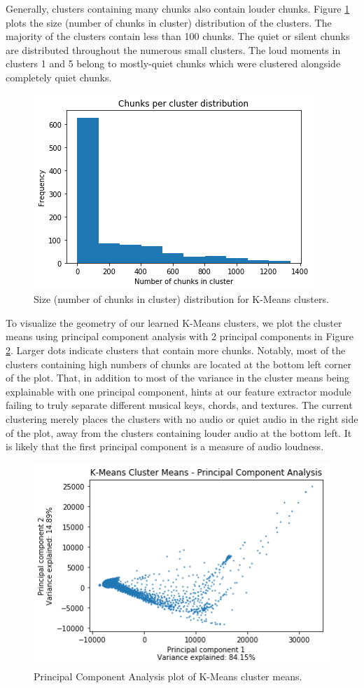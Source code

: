 \documentclass{article}
\begin{document}
Generally, clusters containing many chunks also contain louder chunks. Figure \ref{fig:chunks_per_cluster_distribution} plots the size (number of chunks in cluster) distribution of the clusters. The majority of the clusters contain less than 100 chunks. The quiet or silent chunks are distributed throughout the numerous small clusters. The loud moments in clusters 1 and 5 belong to mostly-quiet chunks which were clustered alongside completely quiet chunks.

\begin{figure}
    \centering
    \includegraphics[width=0.67 \linewidth]{chunks_per_cluster_distribution.png}
    \caption{Size (number of chunks in cluster) distribution for K-Means clusters.}
    \label{fig:chunks_per_cluster_distribution}
\end{figure}

To visualize the geometry of our learned K-Means clusters, we plot the cluster means using principal component analysis with 2 principal components in Figure \ref{fig:kmeans_pca}. Larger dots indicate clusters that contain more chunks. Notably, most of the clusters containing high numbers of chunks are located at the bottom left corner of the plot. That, in addition to most of the variance in the cluster means being explainable with one principal component, hints at our feature extractor module failing to truly separate different musical keys, chords, and textures. The current clustering merely places the clusters with no audio or quiet audio in the right side of the plot, away from the clusters containing louder audio at the bottom left. It is likely that the first principal component is a measure of audio loudness.

\begin{figure}
    \centering
    \includegraphics[width=0.67 \linewidth]{kmeans_pca.png}
    \caption{Principal Component Analysis plot of K-Means cluster means.}
    \label{fig:kmeans_pca}
\end{figure}
\end{document}
